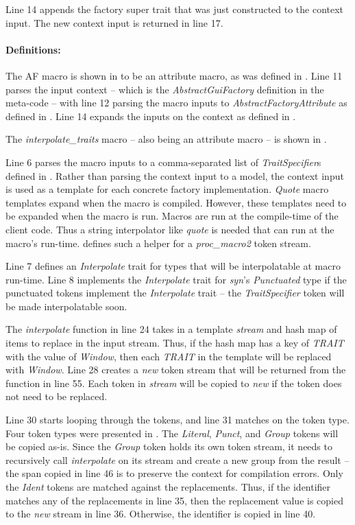Line 14 appends the factory super trait that was just constructed to the context input.
The new context input is returned in line 17.

\paragraph{Definitions:}
The AF macro is shown in  to be an attribute macro, as was defined in .
Line 11 parses the input context -- which is the \textit{AbstractGuiFactory} definition in the meta-code -- with line 12 parsing the macro inputs to \textit{AbstractFactoryAttribute} as defined in .
Line 14 expands the inputs on the context as defined in .

The \textit{interpolate\_traits} macro -- also being an attribute macro -- is shown in .

Line 6 parses the macro inputs to a comma-separated list of \textit{TraitSpecifier}s defined in .
Rather than parsing the context input to a model, the context input is used as a template for each concrete factory implementation.
\textit{Quote} macro templates expand when the macro is compiled.
However, these templates need to be expanded when the macro is run.
Macros are run at the compile-time of the client code.
Thus a string interpolator like \textit{quote} is needed that can run at the macro's run-time.
 defines such a helper for a \textit{proc\_macro2} token stream.

Line 7 defines an \textit{Interpolate} trait for types that will be interpolatable at macro run-time.
Line 8 implements the \textit{Interpolate} trait for \textit{syn}'s \textit{Punctuated} type if the punctuated tokens implement the \textit{Interpolate} trait -- the \textit{TraitSpecifier} token will be made interpolatable soon.

The \textit{interpolate} function in line 24 takes in a template \textit{stream} and hash map of items to replace in the input stream.
Thus, if the hash map has a key of \textit{TRAIT} with the value of \textit{Window}, then each \textit{TRAIT} in the template will be replaced with \textit{Window}.
Line 28 creates a \textit{new} token stream that will be returned from the function in line 55.
Each token in \textit{stream} will be copied to \textit{new} if the token does not need to be replaced.

Line 30 starts looping through the tokens, and line 31 matches on the token type.
Four token types were presented in .
The \textit{Literal}, \textit{Punct}, and \textit{Group} tokens will be copied as-is.
Since the \textit{Group} token holds its own token stream, it needs to recursively call \textit{interpolate} on its stream and create a new group from the result -- the span copied in line 46 is to preserve the context for compilation errors.
Only the \textit{Ident} tokens are matched against the replacements.
Thus, if the identifier matches any of the replacements in line 35, then the replacement value is copied to the \textit{new} stream in line 36.
Otherwise, the identifier is copied in line 40.

